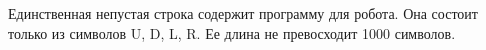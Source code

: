 Единственная непустая строка содержит программу для робота. Она состоит только из символов
U, D, L, R. Ее длина не превосходит 1000 символов.

